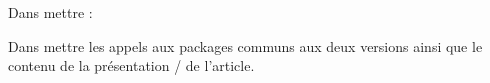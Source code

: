 
Dans  mettre :


Dans  mettre les appels aux packages communs aux deux versions ainsi que le contenu de la présentation / de l'article.



